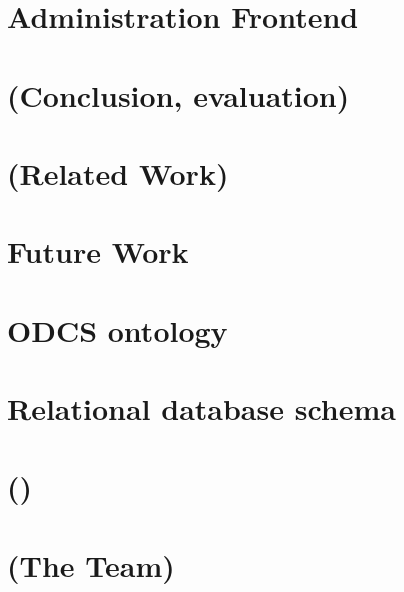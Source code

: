 \chapter{Administration Frontend}

\chapter{(Conclusion, evaluation)}

\chapter{(Related Work)}

\chapter{Future Work}




\appendix

\chapter{ODCS ontology}

\chapter{Relational database schema}

\chapter{()}

\chapter{(The Team)}



